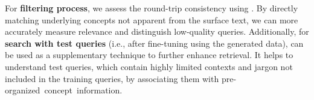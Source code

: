 For \textbf{filtering process}, we assess the round-trip consistency using \proposedtwo.
By directly matching underlying concepts not apparent from the surface text, we can more accurately measure relevance and distinguish low-quality queries.
Additionally, for \textbf{search with test queries} (i.e., after fine-tuning using the generated data), \proposedtwo can be used as a supplementary technique to further enhance retrieval.
It helps to understand test queries, which contain highly limited contexts and jargon not included in the training queries, by associating them with pre-organized~concept~information.


